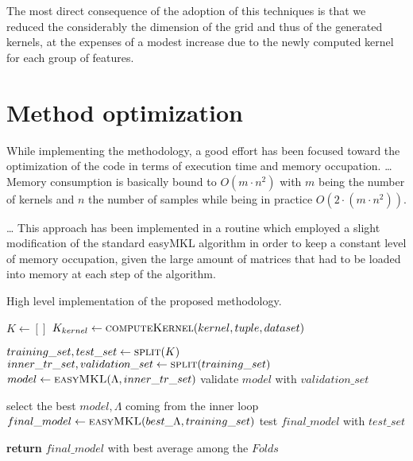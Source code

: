The most direct consequence of the adoption of this techniques is that we reduced
the considerably the dimension of the grid and thus of the generated kernels, at
the expenses of a modest increase due to the newly computed kernel for each group
of features.


\section{Method optimization}
\label{sec:opt}


While implementing the methodology, a good effort has been focused toward the
optimization of the code in terms of execution time and memory occupation.
\dots
Memory consumption is basically bound to $O(m\cdot n^2)$ with $m$ being the number of kernels and
$n$ the number of samples while being in practice $O(2\cdot (m\cdot n^2))$.

\dots
This approach has been implemented in a routine which employed a slight modification
of the standard easyMKL algorithm \cite{easymkl} in order to keep a constant
level of memory occupation, given the large amount of matrices that had to be
loaded into memory at each step of the algorithm.

\begin{algorithm}
    \caption{High level implementation of the proposed methodology.}
    \label{alg:method_me}
    \begin{algorithmic}[1]
        \State $K \gets []$
                \State $K_{kernel} \gets \Call{computeKernel}{kernel, tuple, dataset}$
            \EndFor
        \EndFor

            \State $training\_set, test\_set \gets \Call{split}{K}$
                    \State $inner\_tr\_set, validation\_set \gets \Call{split}{training\_set}$
                    \State $model \gets \Call{easyMKL}{\Lambda,inner\_tr\_set}$
                    \State validate $model$ with $validation\_set$
                \EndFor
            \EndFor
            
            \State select the best $model,\Lambda$ coming from the inner loop
            \State $final\_model \gets \Call{easyMKL}{best\_\Lambda,training\_set}$
            \State test $final\_model$ with $test\_set$
        \EndFor

        \State \textbf{return} $final\_model$ with best average among the $Folds$
    \end{algorithmic}
\end{algorithm}

